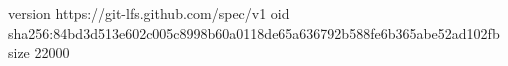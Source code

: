 version https://git-lfs.github.com/spec/v1
oid sha256:84bd3d513e602c005c8998b60a0118de65a636792b588fe6b365abe52ad102fb
size 22000
